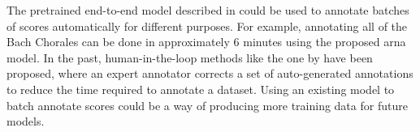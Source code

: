 
The pretrained end-to-end model described in
 could be used to annotate
batches of scores automatically for different purposes. For
example, annotating all of the Bach
Chorales
can be done in approximately 6 minutes using the proposed
\gls{arna} model. In the past, human-in-the-loop methods
like the one by \textcite{ju2019interactive} have been
proposed, where an expert annotator corrects a set of
auto-generated annotations to reduce the time required to
annotate a dataset. Using an existing model to batch
annotate scores could be a way of producing more training
data for future models.
